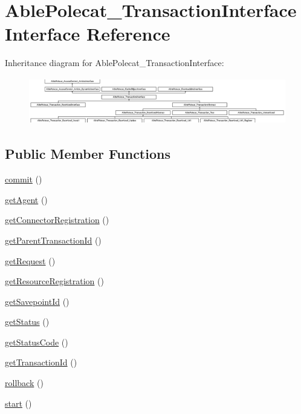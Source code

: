 \hypertarget{interface_able_polecat___transaction_interface}{}\section{Able\+Polecat\+\_\+\+Transaction\+Interface Interface Reference}
\label{interface_able_polecat___transaction_interface}
Inheritance diagram for Able\+Polecat\+\_\+\+Transaction\+Interface\+:\begin{figure}[H]
\begin{center}
\leavevmode
\includegraphics[height=2.048780cm]{interface_able_polecat___transaction_interface}
\end{center}
\end{figure}
\subsection*{Public Member Functions}
\begin{DoxyCompactItemize}
\item 
\hyperlink{interface_able_polecat___transaction_interface_af5674c27d4a92f6228565010eacbb9cb}{commit} ()
\item 
\hyperlink{interface_able_polecat___transaction_interface_a14f9546bbf5895db0fe37673bab21850}{get\+Agent} ()
\item 
\hyperlink{interface_able_polecat___transaction_interface_a3e5ea27c16b5306b60f4b105076ca501}{get\+Connector\+Registration} ()
\item 
\hyperlink{interface_able_polecat___transaction_interface_a780c17f0187ec8dba7d8b35b3325d44c}{get\+Parent\+Transaction\+Id} ()
\item 
\hyperlink{interface_able_polecat___transaction_interface_adf1a35ad20e475c59cc0967d5764aa22}{get\+Request} ()
\item 
\hyperlink{interface_able_polecat___transaction_interface_a8876f6810e05036d8c4007394576f53a}{get\+Resource\+Registration} ()
\item 
\hyperlink{interface_able_polecat___transaction_interface_aaaa36c40332d95e879b5072aba995d27}{get\+Savepoint\+Id} ()
\item 
\hyperlink{interface_able_polecat___transaction_interface_a9d21636071f529e2154051d3ea6e5921}{get\+Status} ()
\item 
\hyperlink{interface_able_polecat___transaction_interface_a094778dd1c04fe44626000b47ea0c0bb}{get\+Status\+Code} ()
\item 
\hyperlink{interface_able_polecat___transaction_interface_a83a4c2954e4da6dad24e596265e33d0a}{get\+Transaction\+Id} ()
\item 
\hyperlink{interface_able_polecat___transaction_interface_afa549adf79e3f8c09fe8f903dd5fbfa7}{rollback} ()
\item 
\hyperlink{interface_able_polecat___transaction_interface_af8fa59992209e36dccb3eefb0f75531f}{start} ()
\end{DoxyCompactItemize}
